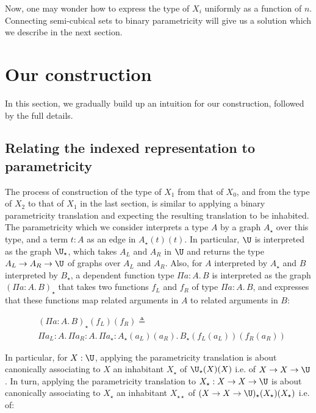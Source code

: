 \documentclass[10pt]{art.cls/art}
\newcommand{\defeq}{\ensuremath{\triangleq}}
\newcommand{\kstar}{{\star}}
\begin{document}
Now, one may wonder how to express the type of $X_i$ uniformly as a function of $n$. Connecting semi-cubical sets to binary parametricity will give us a solution which we describe in the next section.

\section{Our construction}
In this section, we gradually build up an intuition for our construction, followed by the full details.

\subsection{Relating the indexed representation to parametricity}
The process of construction of the type of $X_1$ from that of $X_0$, and from the type of $X_2$ to that of $X_1$ in the last section, is similar to applying a binary parametricity translation and expecting the resulting translation to be inhabited. The parametricity which we consider interprets a type $A$ by a graph $A_\kstar$ over this type, and a term $t: A$ as an edge in $A_\kstar(t)(t)$. In particular, $\U$ is interpreted as the graph ${\U}_\kstar$, which takes $A_L$ and $A_R$ in $\U$ and returns the type $A_L \rightarrow A_R \rightarrow \U$ of graphs over $A_L$ and $A_R$. Also, for $A$ interpreted by $A_\kstar$ and $B$ interpreted by $B_\kstar$, a dependent function type $\Pi a: A.\, B$ is interpreted as the graph $(\Pi a: A.\, B)_\kstar$ that takes two functions $f_L$ and $f_R$ of type $\Pi a: A.\, B$, and expresses that these functions map related arguments in $A$ to related arguments in $B$:

\begin{align*}
   & (\Pi a: A.\, B)_\kstar(f_L)(f_R) \defeq                                                      \\
   & \Pi a_L: A.\, \Pi a_R: A.\, \Pi a_\kstar: A_\kstar(a_L)(a_R).\, B_\kstar(f_L(a_L))(f_R(a_R))
\end{align*}

In particular, for $X: \U$, applying the parametricity translation is about canonically associating to $X$ an inhabitant $X_\kstar$ of ${\U}_\kstar(X)(X)$ i.e. of $X \rightarrow X \rightarrow \U$. In turn, applying the parametricity translation to $X_\kstar: X \rightarrow X \rightarrow \U$ is about canonically associating to $X_\kstar$ an inhabitant $X_{\kstar\kstar}$ of $(X \rightarrow X \rightarrow \U)_\kstar(X_\kstar)(X_\kstar)$ i.e. of:
\end{document}
